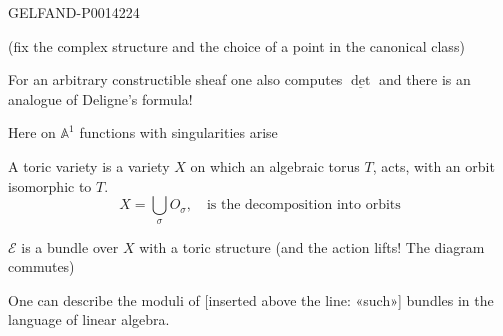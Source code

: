 \begin{GelfandAdjacentEvidence}{GELFAND-P001422}{4}


(fix the complex structure and the choice of a point in the canonical class)

For an arbitrary constructible sheaf one also computes \(\underline{\det}\) and there is an analogue of Deligne’s formula!

Here on \(\mathbb A^1\) functions with singularities arise

\qquad {}

A toric variety is a variety \(X\) on which an algebraic torus \(T\),
acts, with an orbit isomorphic to \(T\).
\[
X=\bigcup_\sigma O_\sigma,\quad\text{is the decomposition into orbits}
\]

\(\mathcal E\) is a bundle over \(X\) with a toric structure
(and the action lifts! The diagram commutes)

\end{GelfandAdjacentEvidence}


One can describe the moduli of [inserted above the line: «such»] bundles in the language of linear algebra.


